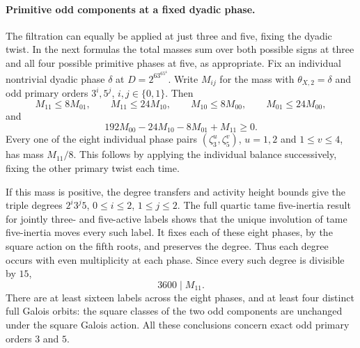 \documentclass[11pt,a4paper]{article}
\numberwithin{equation}{section}
\theoremstyle{remark}
\begin{document}
\paragraph{Primitive odd components at a fixed dyadic phase.}
The filtration can equally be applied at just three and five, fixing
the dyadic twist. In the next formulas the total masses sum over
both possible signs at three and all four possible primitive
phases at five, as appropriate.
Fix an individual nontrivial dyadic phase $\delta$ at
$D=2^63^65^4$. Write $M_{ij}$ for the mass with
$\theta_{X,2}=\delta$ and odd primary orders $3^i,5^j$,
$i,j\in\{0,1\}$. Then
\[
 M_{11}\le 8M_{01},\qquad M_{11}\le24M_{10},\qquad
 M_{10}\le8M_{00},\qquad M_{01}\le24M_{00},
\]
and
\[
 192M_{00}-24M_{10}-8M_{01}+M_{11}\ge0.
\]
Every one of the eight individual phase pairs
$(\zeta_3^u,\zeta_5^v)$, $u=1,2$ and $1\le v\le4$, has mass
$M_{11}/8$. This follows by applying the individual balance
successively, fixing the other primary twist each time.

If this mass is positive, the degree transfers and activity height
bounds give the triple degrees $2^i3^j5$, $0\le i\le2$,
$1\le j\le2$. The full quartic tame five-inertia result for jointly
three- and five-active labels shows that the unique involution of
tame five-inertia moves every such label. It fixes each of these
eight phases, by the square action on the fifth roots, and preserves
the degree. Thus each degree occurs with even multiplicity at each
phase. Since every such degree is divisible by $15$,
\[
                 3600\mid M_{11}.
\]
There are at least sixteen labels across the eight phases, and at
least four distinct full Galois orbits: the square classes of the
two odd components are unchanged under the square Galois action.
All these conclusions concern exact odd primary orders $3$ and $5$.
\end{document}
